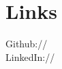 
\section{Links} 
Github:// \href{https://github.com/shan18}{} \\
LinkedIn:// \href{https://www.linkedin.com/in/shantanu-acharya-b3053158/}{}